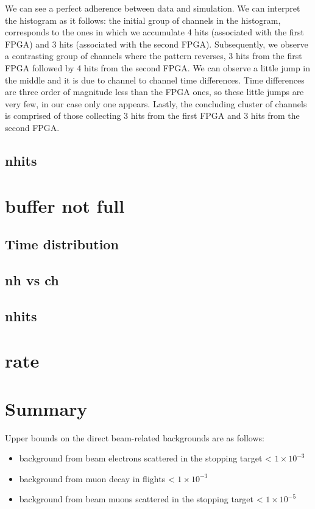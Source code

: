 \documentclass[12pt]{article}
\begin{document}
We can see a perfect adherence between data and simulation. We can interpret the histogram as it follows: the initial group of channels in the histogram,
corresponds to the ones in which we accumulate 4 hits (associated with the first FPGA) and 3 hits (associated with the second FPGA). 
Subsequently, we observe a contrasting group of channels where the pattern reverses, 3 hits from the first FPGA followed by 4 hits from the second FPGA.
We can observe a little jump in the middle and it is due to channel to channel time differences.
Time differences are three order of magnitude less than the FPGA ones, so these little jumps are very few, in our case only one appears.
Lastly, the concluding cluster of channels is comprised of those collecting 3 hits from the first FPGA and 3 hits from the second FPGA.



\subsection{nhits}

\section{buffer not full}
\subsection{Time distribution}
\subsection{nh vs ch}
\subsection{nhits}

\section{rate}









\newpage
\section{Summary}
Upper bounds on the direct beam-related backgrounds are as follows:
\begin{itemize}
\item
  background from beam electrons scattered in the stopping target < $1 \times 10^{-3}$
\item
  background from muon decay in flights < $1 \times 10^{-3}$
\item
  background from beam muons scattered in the stopping target < $1 \times 10^{-5}$
\end{itemize}
%
\newpage


\end{document}
